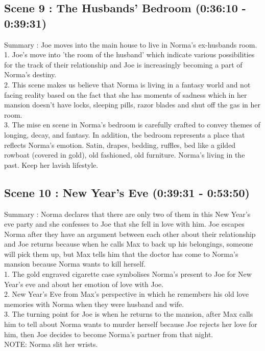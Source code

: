 \documentclass[a4paper]{article}
\begin{document}
\subsection{Scene 9 : The Husbands’ Bedroom (0:36:10 - 0:39:31)}
Summary : Joe moves into the main house to live in Norma’s ex-husbands room.\\
1. Joe's move into 'the room of the husband' which indicate various possibilities for the
track of their relationship and Joe is increasingly becoming a part of Norma's destiny.\\
2. This scene makes us believe that Norma is living in a fantasy world and not facing
reality based on the fact that she has moments of sadness which in her mansion
doesn’t have locks, sleeping pills, razor blades and shut off the gas in her room.\\
3. The mise en scene in Norma's bedroom is carefully crafted to convey themes of
longing, decay, and fantasy. In addition, the bedroom represents a place that reflects
Norma's emotion. Satin, drapes, bedding, ruffles, bed like a gilded rowboat (covered in
gold), old fashioned, old furniture. Norma’s living in the past. Keep her lavish
lifestyle.\\

\subsection{Scene 10 : New Year’s Eve (0:39:31 - 0:53:50)}
Summary : Norma declares that there are only two of them in this New Year’s eve party and
she confesses to Joe that she fell in love with him. Joe escapes Norma after they have an
argument between each other about their relationship and Joe returns because when he
calls Max to back up his belongings, someone will pick them up, but Max tells him that the
doctor has come to Norma’s mansion because Norma wants to kill herself.\\
1. The gold engraved cigarette case symbolises Norma’s present to Joe for New Year’s
eve and about her emotion of love with Joe.\\
2. New Year’s Eve from Max’s perspective in which he remembers his old love
memories with Norma when they were husband and wife.\\
3. The turning point for Joe is when he returns to the mansion, after Max calls him to tell
about Norma wants to murder herself because Joe rejects her love for him, then Joe
decides to become Norma’s partner from that night.\\
NOTE: Norma slit her wrists.\\
\end{document}
